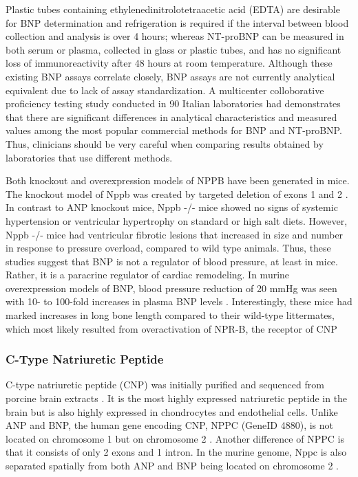 \documentclass[14pt,a4paper,onecolumn]{extarticle}
\begin{document}
Plastic tubes containing ethylenedinitrolotetraacetic acid (EDTA) are desirable for BNP determination and refrigeration is required if the interval between blood collection and analysis is over 4 hours; whereas NT-proBNP can be measured in both serum or plasma, collected in glass or plastic tubes, and has no significant loss of immunoreactivity after 48 hours at room temperature. Although these existing BNP assays correlate closely, BNP assays are not currently analytical equivalent due to lack of assay standardization.\citep{Omland2008}  A multicenter colloborative proficiency testing study conducted in 90 Italian laboratories had demonstrates that there are significant differences in analytical characteristics and measured values among the most popular commercial methods for BNP and NT-proBNP. Thus, clinicians should be very careful when comparing results obtained by laboratories that use different methods.\citep{Prontera2009}

Both knockout and overexpression models of NPPB have been generated in mice. The knockout model of Nppb was created by targeted deletion of exons 1 and 2 \citep{Tamura2000}. In contrast to ANP knockout mice, Nppb -/- mice showed no signs of systemic hypertension or ventricular hypertrophy on standard or high salt diets. However, Nppb -/- mice had ventricular fibrotic lesions that increased in size and number in response to pressure overload, compared to wild type animals. Thus, these studies suggest that BNP is not a regulator of blood pressure, at least in mice. Rather, it is a paracrine regulator of cardiac remodeling. In murine overexpression models of BNP, blood pressure reduction of 20 mmHg was seen with 10- to 100-fold increases in plasma BNP levels \citep{Ogawa1994a}. Interestingly, these mice had marked increases in long bone length compared to their wild-type littermates, which most likely resulted from overactivation of NPR-B, the receptor of CNP

\subsubsection{C-Type Natriuretic Peptide}
C-type natriuretic peptide (CNP) was initially purified and sequenced from porcine brain extracts \citep{Sudoh1990}. It is the most highly expressed natriuretic peptide in the brain but is also highly expressed in chondrocytes and endothelial cells. Unlike ANP and BNP, the human gene encoding CNP, NPPC (GeneID 4880), is not located on chromosome 1 but on chromosome 2 \citep{Ogawa1994b}. Another difference of NPPC is that it consists of only 2 exons and 1 intron. In the murine genome, Nppc is also separated spatially from both ANP and BNP being located on chromosome 2 \citep{Ogawa1994b}.
\end{document}
